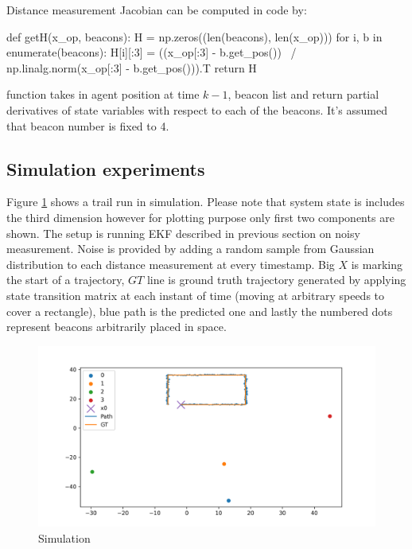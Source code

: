 Distance measurement Jacobian can be computed in code by:

\begin{minipage}{\linewidth}
\begin{python}
def getH(x_op, beacons):
    H = np.zeros((len(beacons), len(x_op)))
    for i, b in enumerate(beacons):
        H[i][:3] = ((x_op[:3] - b.get_pos()) \
            / np.linalg.norm(x_op[:3] - b.get_pos())).T
    return H
\end{python}
\end{minipage}
function takes in agent position at time $k-1$, beacon list and return partial derivatives of state variables with respect to each of the beacons. It's assumed that beacon number is fixed to 4.

\subsection{Simulation experiments}

Figure \ref{fig:sim} shows a trail run in simulation. Please note that system state is includes the third dimension however for plotting purpose only first two components are shown. The setup is running EKF described in previous section on noisy measurement. Noise is provided by adding a random sample from Gaussian distribution to each distance measurement at every timestamp. Big $X$ is marking the start of a trajectory, $GT$ line is ground truth trajectory generated by applying state transition matrix at each instant of time (moving at arbitrary speeds to cover a rectangle), blue path is the predicted one and lastly the numbered dots represent beacons arbitrarily placed in space.
\begin{figure}[H]
    \includegraphics[width=\linewidth]{figures/sim.png}
    \caption{Simulation}
    \label{fig:sim}
\end{figure}

